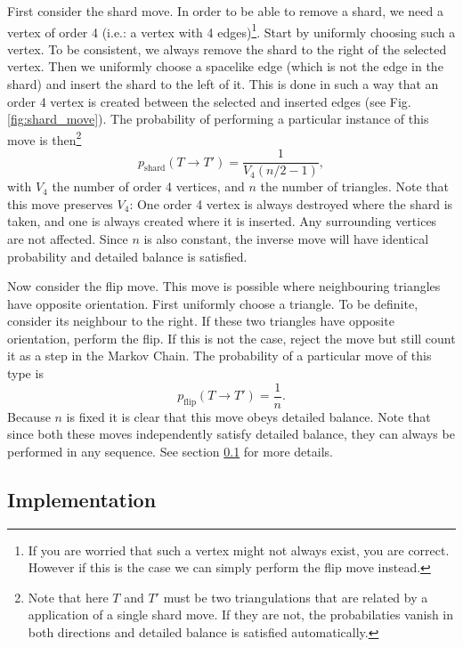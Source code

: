 First consider the shard move. In order to be able to remove a shard, we need a vertex of order 4 (i.e.: a vertex with 4 edges)\footnote{If you are worried that such a vertex might not always exist, you are correct. However if this is the case we can simply perform the flip move instead.}. Start by uniformly choosing such a vertex. To be consistent, we always remove the shard to the right of the selected vertex. Then we uniformly choose a spacelike edge (which is not the edge in the shard) and insert the shard to the left of it. This is done in such a way that an order 4 vertex is created between the selected and inserted edges (see Fig. \ref{fig:shard_move}). The probability of performing a particular instance of this move is then\footnote{Note that here $T$ and $T'$ must be two triangulations that are related by a application of a single shard move. If they are not, the probabilaties vanish in both directions and detailed balance is satisfied automatically.}
\begin{equation}
    p_{\text{shard}}(T \to T') = \frac{1}{V_4 (n/2 - 1)},
\end{equation}
with $V_4$ the number of order 4 vertices, and $n$ the number of triangles. Note that this move preserves $V_4$: One order 4 vertex is always destroyed where the shard is taken, and one is always created where it is inserted. Any surrounding vertices are not affected. Since $n$ is also constant, the inverse move will have identical probability and detailed balance is satisfied.

Now consider the flip move. This move is possible where neighbouring triangles have opposite orientation. First uniformly choose a triangle. To be definite, consider its neighbour to the right. If these two triangles have opposite orientation, perform the flip. If this is not the case, reject the move but still count it as a step in the Markov Chain. The probability of a particular move of this type is
\begin{equation}
    p_{\text{flip}}(T \to T') = \frac{1}{n}.
\end{equation}
Because $n$ is fixed it is clear that this move obeys detailed balance. Note that since both these moves independently satisfy detailed balance, they can always be performed in any sequence. See section \ref{sec:implementation} for more details.

\subsection{Implementation}\label{sec:implementation}

